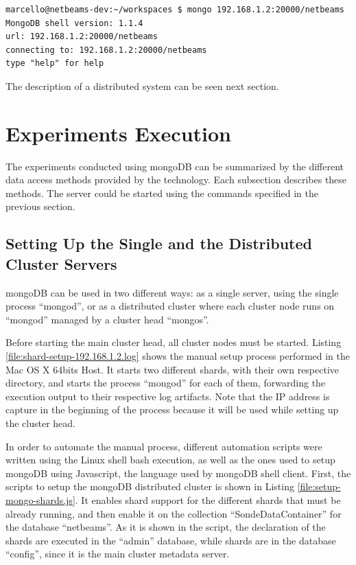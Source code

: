 \lstset{label=cmd:mongodb-client-start,caption=Starting the Server}
\begin{lstlisting}
marcello@netbeams-dev:~/workspaces $ mongo 192.168.1.2:20000/netbeams
MongoDB shell version: 1.1.4
url: 192.168.1.2:20000/netbeams
connecting to: 192.168.1.2:20000/netbeams
type "help" for help
\end{lstlisting}

The description of a distributed system can be seen next section.

\section{Experiments Execution}
\label{sec:experiment-execution}

The experiments conducted using mongoDB can be summarized by the different data
access methods provided by the technology. Each subsection describes these
methods. The server could be started using the commands specified in the
previous section.

\subsection{Setting Up the Single and the Distributed Cluster Servers}
\label{sec:experiments-setup-single-distributed}
mongoDB can be used in two different ways: as a single server, using the single
process ``mongod'', or as a distributed cluster where each cluster node runs on
``mongod'' managed by a cluster head ``mongos''. 

Before starting the main cluster head, all cluster nodes must be started.
Listing \ref{file:shard-setup-192.168.1.2.log} shows the manual setup process
performed in the Mac OS X 64bits Host. It starts two different shards, with
their own respective directory, and starts the process ``mongod'' for each of
them, forwarding the execution output to their respective log artifacts. Note
that the IP address is capture in the beginning of the process because it will
be used while setting up the cluster head.

In order to automate the manual process, different automation scripts were
written using the Linux shell bash execution, as well as the ones used to setup
mongoDB using Javascript, the language used by mongoDB shell client. First, the
scripts to setup the mongoDB distributed cluster is shown in Listing
\ref{file:setup-mongo-shards.js}. It enables shard support for the different
shards that must be already running, and then enable it on the collection
``SondeDataContainer'' for the database ``netbeams''. As it is shown in the
script, the declaration of the shards are executed in the ``admin'' database,
while shards are in the database ``config'', since it is the main cluster
metadata server.

